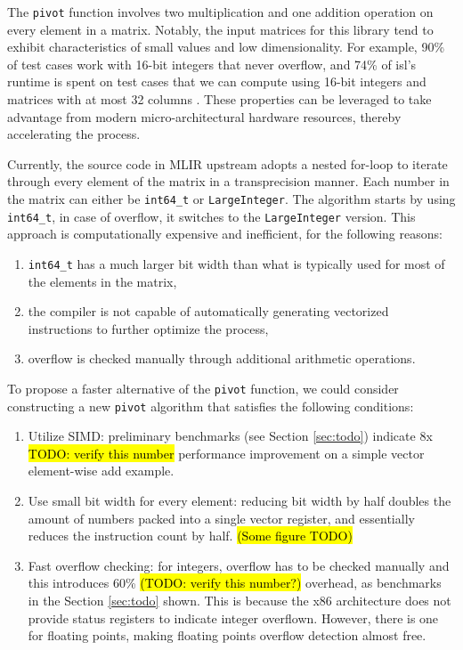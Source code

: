 \documentclass[logo,bsc,singlespacing,parskip]{infthesis}
\begin{document}
The \texttt{pivot} function involves two multiplication and one addition
operation on every element in a matrix. Notably, the input matrices for this
library tend to exhibit characteristics of small values and low dimensionality.
For example, 90\% of test cases work with 16-bit integers that never overflow,
and 74\% of isl’s runtime is spent on test cases that we can compute using
16-bit integers and matrices with at most 32 columns \cite{FPL2}. These
properties can be leveraged to take advantage from modern micro-architectural
hardware resources, thereby accelerating the process.

Currently, the source code in MLIR upstream adopts a nested for-loop to iterate
through every element of the matrix in a transprecision manner. Each number in
the matrix can either be \texttt{int64\_t} or \texttt{LargeInteger}. The
algorithm starts by using \texttt{int64\_t}, in case of overflow, it switches to
the \texttt{LargeInteger} version. This approach is computationally expensive
and inefficient, for the following reasons: 
\begin{enumerate}

\item \texttt{int64\_t} has a much larger bit width than what is typically
used for most of the elements in the matrix,

\item the compiler is not capable of automatically generating vectorized
instructions to further optimize the process,

\item overflow is checked manually through additional arithmetic
operations.

\end{enumerate}

To propose a faster alternative of the \texttt{pivot} function, we could
consider constructing a new \texttt{pivot} algorithm that satisfies the
following conditions:
\begin{enumerate}

\item Utilize SIMD: preliminary benchmarks (see Section \ref{sec:todo}) indicate
8x \hl{TODO: verify this number} performance improvement on a simple vector
element-wise add example. 

\item Use small bit width for every element: reducing bit width by half doubles the
amount of numbers packed into a single vector register, and essentially reduces
the instruction count by half.  \hl{(Some figure TODO)}

\item Fast overflow checking: for integers, overflow has to be checked manually
and this introduces 60\%  \hl{(TODO: verify this number?)} overhead, as
benchmarks in the Section \ref{sec:todo} shown. This is because the x86
architecture does not provide status registers to indicate integer overflown.
However, there is one for floating points, making floating points overflow
detection almost free. 

\end{enumerate}
\end{document}
